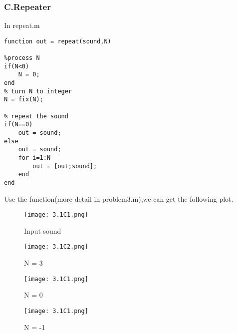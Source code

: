 \documentclass{article}
\begin{document}
\subsubsection*{C.Repeater}
In repeat.m
\begin{lstlisting}
function out = repeat(sound,N)

%process N
if(N<0)
    N = 0;
end
% turn N to integer
N = fix(N);

% repeat the sound
if(N==0)
    out = sound;
else
    out = sound;
    for i=1:N
        out = [out;sound];
    end
end
\end{lstlisting}
Use the function(more detail in problem3.m),we can get the following plot.
\begin{figure}[h]
    \begin{minipage}{0.45\textwidth}
        \centering
        \texttt{[image: 3.1C1.png]}
        \caption{Input sound}
    \end{minipage}
    \begin{minipage}{0.45\textwidth}
        \centering
        \texttt{[image: 3.1C2.png]}
        \caption{N = 3}
    \end{minipage}
    \quad

    \begin{minipage}{0.45\textwidth}
        \centering
        \texttt{[image: 3.1C1.png]}
        \caption{N = 0}
    \end{minipage}
    \begin{minipage}{0.45\textwidth}
        \centering
        \texttt{[image: 3.1C1.png]}
        \caption{N = -1}
    \end{minipage}
\end{figure}
\end{document}
